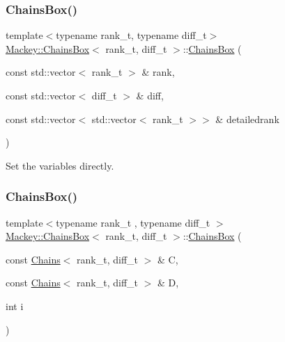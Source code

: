 \subsubsection{\texorpdfstring{Chains\+Box()}{ChainsBox()}\hspace{0.1cm}{\footnotesize\ttfamily [2/4]}}
{\footnotesize\ttfamily template$<$typename rank\+\_\+t, typename diff\+\_\+t$>$ \\
\hyperlink{classMackey_1_1ChainsBox}{Mackey\+::\+Chains\+Box}$<$ rank\+\_\+t, diff\+\_\+t $>$\+::\hyperlink{classMackey_1_1ChainsBox}{Chains\+Box} (\begin{DoxyParamCaption}\item[{const std\+::vector$<$ rank\+\_\+t $>$ \&}]{rank,  }\item[{const std\+::vector$<$ diff\+\_\+t $>$ \&}]{diff,  }\item[{const std\+::vector$<$ std\+::vector$<$ rank\+\_\+t $>$$>$ \&}]{detailedrank }\end{DoxyParamCaption})\hspace{0.3cm}{\ttfamily [inline]}}



Set the variables directly. 

\mbox{\label{classMackey_1_1ChainsBox_a5ad9aaa3181850b3e297e698ea8eb39f}} 
\subsubsection{\texorpdfstring{Chains\+Box()}{ChainsBox()}\hspace{0.1cm}{\footnotesize\ttfamily [3/4]}}
{\footnotesize\ttfamily template$<$typename rank\+\_\+t , typename diff\+\_\+t $>$ \\
\hyperlink{classMackey_1_1ChainsBox}{Mackey\+::\+Chains\+Box}$<$ rank\+\_\+t, diff\+\_\+t $>$\+::\hyperlink{classMackey_1_1ChainsBox}{Chains\+Box} (\begin{DoxyParamCaption}\item[{const \hyperlink{classMackey_1_1Chains}{Chains}$<$ rank\+\_\+t, diff\+\_\+t $>$ \&}]{C,  }\item[{const \hyperlink{classMackey_1_1Chains}{Chains}$<$ rank\+\_\+t, diff\+\_\+t $>$ \&}]{D,  }\item[{int}]{i }\end{DoxyParamCaption})}



